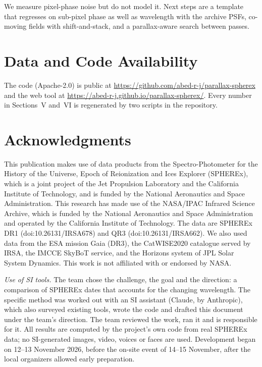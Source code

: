 \documentclass[conference]{IEEEtran}
\begin{document}
We measure pixel-phase noise but do not model it. Next steps are a template that regresses on sub-pixel phase as well as wavelength with the archive PSFs, co-moving fields with shift-and-stack, and a parallax-aware search between passes.

\section*{Data and Code Availability}

The code (Apache-2.0) is public at \url{https://github.com/abed-r-j/parallax-spherex} and the web tool at \url{https://abed-r-j.github.io/parallax-spherex/}. Every number in Sections~V and~VI is regenerated by two scripts in the repository.

\section*{Acknowledgments}

This publication makes use of data products from the Spectro-Photometer for the History of the Universe, Epoch of Reionization and Ices Explorer (SPHEREx), which is a joint project of the Jet Propulsion Laboratory and the California Institute of Technology, and is funded by the National Aeronautics and Space Administration. This research has made use of the NASA/IPAC Infrared Science Archive, which is funded by the National Aeronautics and Space Administration and operated by the California Institute of Technology. The data are SPHEREx DR1 (doi:10.26131/IRSA678) and QR3 (doi:10.26131/IRSA662). We also used data from the ESA mission Gaia (DR3), the CatWISE2020 catalogue served by IRSA, the IMCCE SkyBoT service, and the Horizons system of JPL Solar System Dynamics. This work is not affiliated with or endorsed by NASA.

\emph{Use of SI tools.} The team chose the challenge, the goal and the direction: a comparison of SPHEREx dates that accounts for the changing wavelength. The specific method was worked out with an SI assistant (Claude, by Anthropic), which also surveyed existing tools, wrote the code and drafted this document under the team's direction. The team reviewed the work, ran it and is responsible for it. All results are computed by the project's own code from real SPHEREx data; no SI-generated images, video, voices or faces are used. Development began on 12--13 November 2026, before the on-site event of 14--15 November, after the local organizers allowed early preparation.



\end{document}

